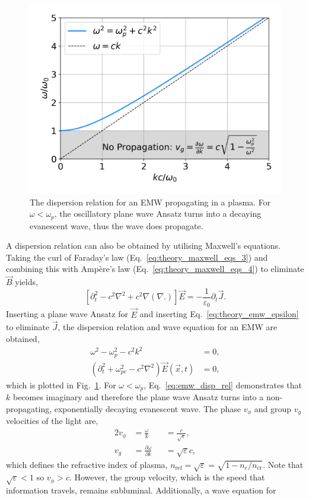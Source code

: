 \begin{figure}[t!]
    \includegraphics[width=0.6\linewidth]{Theory/Images/EMW_disp_rel.png}
    \centering
    \caption{The dispersion relation for an \ac{EMW} propagating in a plasma.
    For $\omega<\omega_p$, the oscillatory plane wave Ansatz turns into a decaying evanescent wave, thus the wave does propagate.}%
    \label{fig:EMW_disp_rel}
\end{figure}

A dispersion relation can also be obtained by utilising Maxwell's equations.
Taking the curl of Faraday's law (Eq.~\ref{eq:theory_maxwell_eqs_3}) and combining this with Amp\`ere's law (Eq.~\ref{eq:theory_maxwell_eqs_4}) to eliminate $\vec{B}$ yields,
\begin{equation}
    \label{eq:theory_manipulatedmaxwell}
    \left[ \partial_t^2 - c^2\nabla^2 + c^2 \nabla(\nabla.) \right]\vec{E} = -\frac{1}{\varepsilon_0}\partial_t \vec{J}.
\end{equation}
Inserting a plane wave Ansatz for $\vec{E}$ and inserting Eq.~\ref{eq:theory_emw_epsilon} to eliminate $\vec{J}$, the dispersion relation and wave equation for an \ac{EMW} are obtained,
\begin{align}
    \label{eq:emw_disp_rel}
    \omega^2 - \omega_p^2 - c^2 k^2 &= 0,\\
    \label{eq:theory_emw_wave_eq}
    \left( \partial_t^2 + \omega_{pe}^2 - c^2\nabla^2 \right)\vec{E}(\vec{x},t) &= 0,
\end{align}
which is plotted in Fig.~\ref{fig:EMW_disp_rel}.
For $\omega<\omega_p$, Eq.~\ref{eq:emw_disp_rel} demonstrates that $k$ becomes imaginary and therefore the plane wave Ansatz turns into a non-propagating, exponentially decaying evanescent wave.
The phase $v_\phi$ and group $v_g$ velocities of the light are,
\begin{alignat}{2}
    v_\phi &= \frac{\omega}{k} &&= \frac{c}{\sqrt{\varepsilon}},\\
    v_g &= \frac{\partial \omega}{\partial k} &&= \sqrt{\varepsilon} c,
\end{alignat}
which defines the refractive index of plasma, $n_{\text{ref}}=\sqrt{\varepsilon} = \sqrt{1-n_e/n_{\text{cr}}}$.
Note that $\sqrt{\varepsilon}<1$ so $v_\phi>c$.
However, the group velocity, which is the speed that information travels, remains subluminal.
Additionally, a wave equation for 

